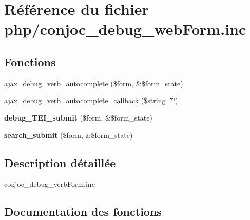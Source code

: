 \hypertarget{php_2conjoc__debug__webForm_8inc}{}\section{Référence du fichier php/conjoc\+\_\+debug\+\_\+web\+Form.inc}
\label{php_2conjoc__debug__webForm_8inc}
\subsection*{Fonctions}
\begin{DoxyCompactItemize}
\item 
\hyperlink{php_2conjoc__debug__webForm_8inc_aafe244ee66a2c6e333d48efccec9164f}{ajax\+\_\+debug\+\_\+verb\+\_\+autocomplete} (\$form, \&\$form\+\_\+state)
\item 
\hyperlink{php_2conjoc__debug__webForm_8inc_aedd67c4b770b58826708010ce4ef7ac7}{ajax\+\_\+debug\+\_\+verb\+\_\+autocomplete\+\_\+callback} (\$string=\char`\"{}\char`\"{})
\item 
\hypertarget{php_2conjoc__debug__webForm_8inc_af6a94ce95f29fca17e5a3fb82855e835}{}\label{php_2conjoc__debug__webForm_8inc_af6a94ce95f29fca17e5a3fb82855e835} 
{\bfseries debug\+\_\+\+T\+E\+I\+\_\+submit} (\$form, \&\$form\+\_\+state)
\item 
\hypertarget{php_2conjoc__debug__webForm_8inc_a11d1063e5c7b2bf2e290639c78266d71}{}\label{php_2conjoc__debug__webForm_8inc_a11d1063e5c7b2bf2e290639c78266d71} 
{\bfseries search\+\_\+submit} (\$form, \&\$form\+\_\+state)
\end{DoxyCompactItemize}


\subsection{Description détaillée}
conjoc\+\_\+debug\+\_\+verb\+Form.\+inc 

\subsection{Documentation des fonctions}
\hypertarget{php_2conjoc__debug__webForm_8inc_aafe244ee66a2c6e333d48efccec9164f}{}\label{php_2conjoc__debug__webForm_8inc_aafe244ee66a2c6e333d48efccec9164f} 
